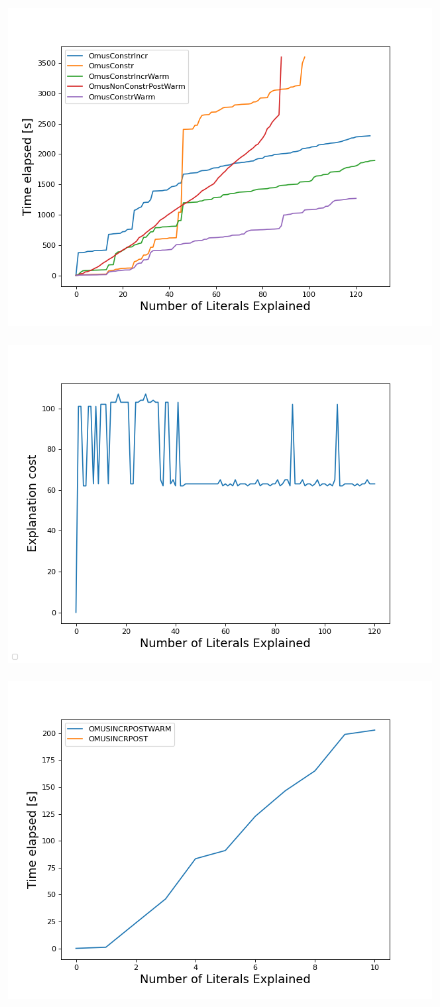 \begin{figure}[]
    \centering
    \includegraphics[width=\textwidth]{figures/omusConstrCumulative.png}
    \caption{}
    \label{}
\end{figure}

\begin{figure}[]
    \centering
    \includegraphics[width=\textwidth]{figures/explanation_cost.png}
    \caption{}
    \label{}
\end{figure}

\begin{figure}[]
    \centering
    \includegraphics[width=\textwidth]{figures/omusNonConstrCumulative.png}
    \caption{}
    \label{}
\end{figure}
